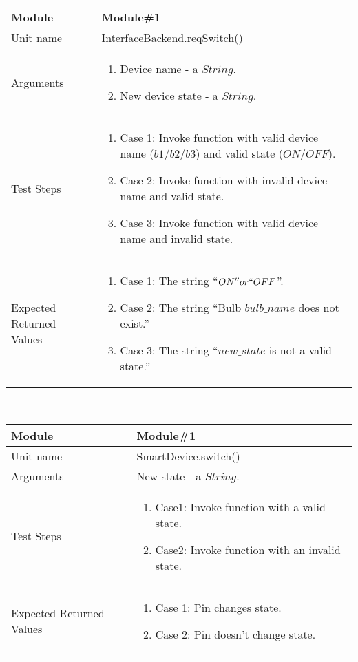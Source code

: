 \begin{tabular}{|p{4cm}|p{9cm}|}
\hline
Module & Module\#1 \\
\hline
Unit name & InterfaceBackend.reqSwitch() \\
\hline
\vspace*{\baselineskip}Arguments & \begin{enumerate}
\item Device name - a $String$.
\item New device state - a $String$.
\end{enumerate} \\
\hline
\vspace*{\baselineskip}Test Steps & \begin{enumerate}
\item[] Case 1: Invoke function with valid device name ($b1/b2/b3$) and valid state ($ON/OFF$).
\item[] Case 2: Invoke function with invalid device name and valid state.
\item[] Case 3: Invoke function with valid device name and invalid state.
\end{enumerate}\\
\hline
\vspace*{\baselineskip}Expected Returned Values & \begin{enumerate}
\item[] Case 1: The string ``$ON'' or ``OFF$''.
\item[] Case 2: The string ``Bulb $bulb\_name$ does not exist.''
\item[] Case 3: The string ``$new\_state$ is not a valid state.''
\end{enumerate} \\
\hline
\end{tabular}
\\[2\baselineskip]
%
\begin{tabular}{|p{4cm}|p{9cm}|}
\hline
Module & Module\#1 \\
\hline
Unit name & SmartDevice.switch() \\
\hline
Arguments & New state - a $String$. \\
\hline
\vspace*{\baselineskip}Test Steps & \begin{enumerate}
\item[] Case1: Invoke function with a valid state.
\item[] Case2: Invoke function with an invalid state.
\end{enumerate}\\
\hline
\vspace*{\baselineskip}Expected Returned Values & \begin{enumerate}
\item[] Case 1: Pin changes state.
\item[] Case 2: Pin doesn't change state.
\end{enumerate} \\
\hline
\end{tabular}
